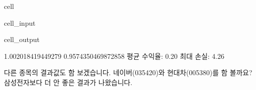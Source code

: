 \documentclass[letterpaper,10pt,english]{jupyterBook}
\begin{document}
\begin{sphinxuseclass}{cell}
\begin{sphinxVerbatimInput}
\begin{sphinxuseclass}{cell_input}
\begin{sphinxVerbatim}[commandchars=\\\{\}]
     \PYG{p}{[}\PYG{p}{[}\PYG{p}{]}\PYG{p}{]}\PYG{p}{[}\PYG{p}{]} \PYG{p}{[}\PYG{p}{[}\PYG{p}{]}\PYG{p}{]}\PYG{p}{[}\PYG{p}{]}

    
 

\end{sphinxVerbatim}

\end{sphinxuseclass}\end{sphinxVerbatimInput}
\begin{sphinxVerbatimOutput}

\begin{sphinxuseclass}{cell_output}
\begin{sphinxVerbatim}[commandchars=\\\{\}]
1.002018419449279 0.9574350469872858
 평균 수익율: 0.20\PYGZpc{} 최대 손실: \PYGZhy{}4.26\PYGZpc{}
\end{sphinxVerbatim}

\end{sphinxuseclass}\end{sphinxVerbatimOutput}

\end{sphinxuseclass}
\sphinxAtStartPar
 다른 종목의 결과값도 함 보겠습니다. 네이버(035420)와 현대차(005380)를 함 볼까요? 삼성전자보다 더 안 좋은 결과가 나왔습니다.
\end{document}
